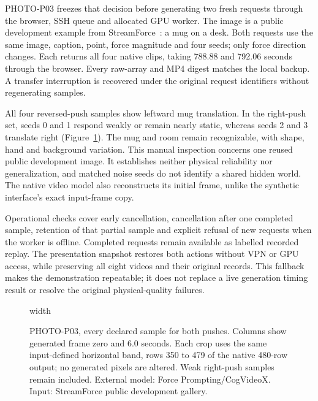 \documentclass[11pt,a4paper]{article}
\begin{document}
PHOTO-P03 freezes that decision before generating two fresh requests through
the browser, SSH queue and allocated GPU worker. The image is a public
development example from StreamForce~\cite{streamforce}: a mug on a desk.
Both requests use the same image, caption, point, force magnitude and four
seeds; only force direction changes. Each returns all four native clips,
taking 788.88 and 792.06 seconds through the browser. Every raw-array and
MP4 digest matches the local backup. A transfer interruption is recovered
under the original request identifiers without regenerating samples.

All four reversed-push samples show leftward mug translation. In the
right-push set, seeds 0 and 1 respond weakly or remain nearly static, whereas
seeds 2 and 3 translate right (Figure~\ref{fig:photo-pair}). The mug and room
remain recognizable, with shape, hand and background variation. This manual
inspection concerns one reused public development image. It establishes
neither physical reliability nor generalization, and matched noise seeds do
not identify a shared hidden world. The native video model also reconstructs
its initial frame, unlike the synthetic interface's exact input-frame copy.

Operational checks cover early cancellation, cancellation after one completed
sample, retention of that partial sample and explicit refusal of new requests
when the worker is offline. Completed requests remain available as labelled
recorded replay. The presentation snapshot restores both actions without VPN
or GPU access, while preserving all eight videos and their original records.
This fallback makes the demonstration repeatable; it does not replace a live
generation timing result or resolve the original physical-quality failures.

\clearpage
\begin{figure}[!ht]
\centering
\pdfximage width\linewidth{report/figures/photo_paired_native.png}\pdfrefximage\pdflastximage
\caption{PHOTO-P03, every declared sample for both pushes. Columns show
generated frame zero and 6.0 seconds. Each crop uses the same input-defined
horizontal band, rows 350 to 479 of the native 480-row output; no generated
pixels are altered. Weak right-push samples remain included. External model:
Force Prompting/CogVideoX. Input: StreamForce public development gallery.}
\label{fig:photo-pair}
\end{figure}
\clearpage
\end{document}
